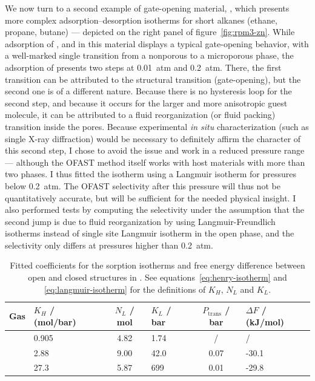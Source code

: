 \documentclass[thesis]{subfiles}
\begin{document}
We now turn to a second example of gate-opening material,
\RPMZn\cite{Lan2009-2}, which presents more complex adsorption--desorption
isotherms for short alkanes (ethane, propane, butane) --- depicted on the right
panel of figure~\ref{fig:rpm3-zn}. While adsorption of , and 
in this material displays a typical gate-opening behavior, with a well-marked
single transition from a nonporous to a microporous phase, the adsorption of
 presents two steps at \SI{0.01}{atm} and \SI{0.2}{atm}. There, the
first transition can be attributed to the structural transition (gate-opening),
but the second one is of a different nature. Because there is no hysteresis loop
for the second step, and because it occurs for the larger and more anisotropic
guest molecule, it can be attributed to a fluid reorganization (or fluid
packing) transition inside the pores. Because experimental \emph{in situ}
characterization (such as single X-ray diffraction) would be necessary to
definitely affirm the character of this second step, I chose to avoid the issue
and work in a reduced pressure range --- although the OFAST method itself works
with host materials with more than two phases. I thus fitted the 
isotherm using a Langmuir isotherm for pressures below \SI{0.2}{atm}. The OFAST
selectivity after this pressure will thus not be quantitatively accurate, but
will be sufficient for the needed physical insight. I also performed tests by
computing the selectivity under the assumption that the second jump is due to
fluid reorganization by using Langmuir-Freundlich isotherms instead of single
site Langmuir isotherm in the open phase, and the selectivity only differs at
pressures higher than \SI{0.2}{atm}.

\begin{table}[htp]
    \renewcommand{\arraystretch}{1.3}
    \begin{tabularx}{\textwidth}{c C c C c C}
        \textbf{Gas} & $K_H$ / (mol/bar) & $N_L$ / mol & $K_L$ / bar & $P_\text{trans}$ / bar & $\Delta F$ / (kJ/mol)  \\ \hline
            & 0.905             & 4.82        & 1.74        &            /           &          /             \\
            & 2.88              & 9.00        & 42.0        &           0.07         &        -30.1           \\
           & 27.3              & 5.87        & 699         &           0.01         &        -29.8           \\
    \end{tabularx}
    \caption{Fitted coefficients for the sorption isotherms and free energy
    difference between open and closed structures in \RPMZn. See
    equations~\eqref{eq:henry-isotherm} and \eqref{eq:langmuir-isotherm} for the
    definitions of $K_H$, $N_L$ and $K_L$.}
    \label{table:rpm3-zn:fit}
\end{table}
\end{document}
